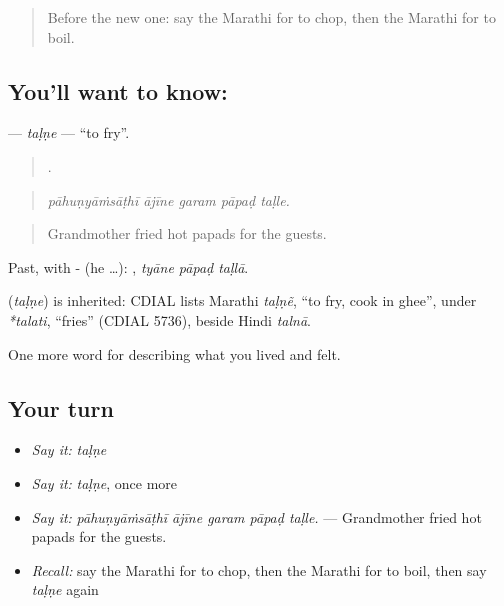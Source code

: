 \label{lesson:MR-C527-talne-fry}



\begin{quote}
Before the new one: say the Marathi for to chop, then the Marathi for to boil.
\end{quote}

\subsection*{You'll want to know: }
\textbf{} — \emph{taḷṇe} — \textquotedblleft{}to fry\textquotedblright{}.

\begin{quote}
    .
\end{quote}

\begin{quote}
\emph{pāhuṇyāṁsāṭhī ājīne garam pāpaḍ taḷle.}
\end{quote}

\begin{quote}
Grandmother fried hot papads for the guests.
\end{quote}

Past, with - (he …):   , \emph{tyāne pāpaḍ taḷlā}.

\begin{cousinweb}
\textbf{} (\emph{taḷṇe}) is inherited: CDIAL lists Marathi \emph{taḷṇẽ}, \textquotedblleft{}to fry, cook in ghee\textquotedblright{}, under \emph{*talati}, \textquotedblleft{}fries\textquotedblright{} (CDIAL 5736), beside Hindi \emph{talnā}.
\end{cousinweb}

\begin{grammarlens}[title={What you've built}]
One more word for describing what you lived and felt.
\end{grammarlens}

\subsection*{Your turn}
\begin{itemize}
\raggedright
  \item \emph{Say it:} \emph{taḷṇe}
  \item \emph{Say it:} \emph{taḷṇe}, once more
  \item \emph{Say it:} \emph{pāhuṇyāṁsāṭhī ājīne garam pāpaḍ taḷle.} — Grandmother fried hot papads for the guests.
  \item \emph{Recall:} say the Marathi for to chop, then the Marathi for to boil, then say \emph{taḷṇe} again
\end{itemize}

